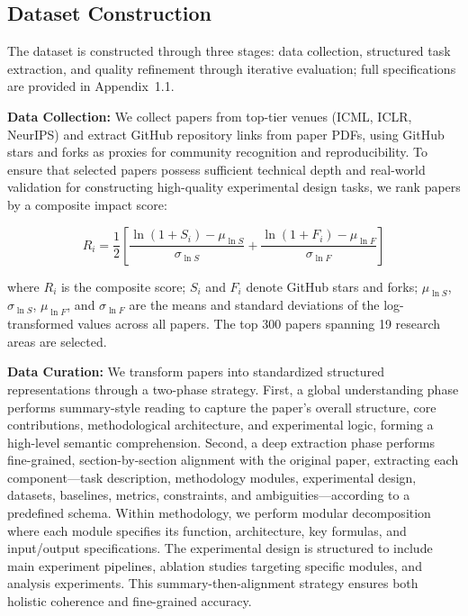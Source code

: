 \documentclass[letterpaper]{article} %
\begin{document}
\subsection{Dataset Construction}
The dataset is constructed through three stages: data collection, structured task extraction,
and quality refinement through iterative evaluation; full specifications are provided in Appendix~1.1. %

\textbf{Data Collection:} We collect papers from top-tier venues (ICML, ICLR, NeurIPS) and extract GitHub repository links
from paper PDFs, using GitHub stars and forks as proxies for community recognition and reproducibility.
To ensure that selected papers possess sufficient technical depth and real-world validation for constructing
high-quality experimental design tasks, we rank papers by a composite impact score:

$$R_i = \frac{1}{2}\left[\frac{\ln(1+S_i) - \mu_{\ln S}}{\sigma_{\ln S}} + \frac{\ln(1+F_i) - \mu_{\ln F}}{\sigma_{\ln F}}\right]$$

where $R_i$ is the composite score; $S_i$ and $F_i$ denote GitHub stars and forks; $\mu_{\ln S}$, $\sigma_{\ln S}$, $\mu_{\ln F}$, and $\sigma_{\ln F}$ are the means and standard deviations of the log-transformed values across all papers.
The top 300 papers spanning 19 research areas are selected.

\textbf{Data Curation:} We transform papers into standardized structured representations through 
a two-phase strategy. First, a global understanding phase performs summary-style reading to capture the paper's overall structure, 
core contributions, methodological architecture, and experimental logic, forming a high-level semantic comprehension. Second, a deep 
extraction phase performs fine-grained, section-by-section alignment with the original paper, extracting each component—task description, 
methodology modules, experimental design, datasets, baselines, metrics, constraints, and ambiguities—according to a predefined schema. 
Within methodology, we perform modular decomposition where each module specifies its function, architecture, key formulas, and 
input/output specifications. The experimental design is structured to include main experiment pipelines, ablation studies targeting 
specific modules, and analysis experiments. This summary-then-alignment strategy ensures both holistic coherence and fine-grained accuracy.
\end{document}
